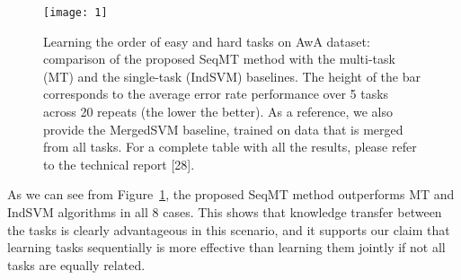 \documentclass[10pt,twocolumn,letterpaper]{article}
\begin{document}
\begin{figure}
\centering
\texttt{[image: 1]}
\caption{Learning the order of easy and hard tasks on AwA
dataset: comparison of the proposed SeqMT method with the
multi-task (MT) and the single-task (IndSVM) baselines. The
height of the bar corresponds to the average error rate performance
over 5 tasks across 20 repeats (the lower the better). As a reference,
we also provide the MergedSVM baseline, trained on data
that is merged from all tasks. For a complete table with all the
results, please refer to the technical report [28].}
\label{fig:1}
\end{figure}

As we can see from Figure~\ref{fig:1}, the
proposed SeqMT method outperforms MT and IndSVM algorithms
in all 8 cases. This shows that knowledge transfer
between the tasks is clearly advantageous in this scenario,
and it supports our claim that learning tasks sequentially
is more effective than learning them jointly if not all tasks
are equally related.

{\small


}
\end{document}
